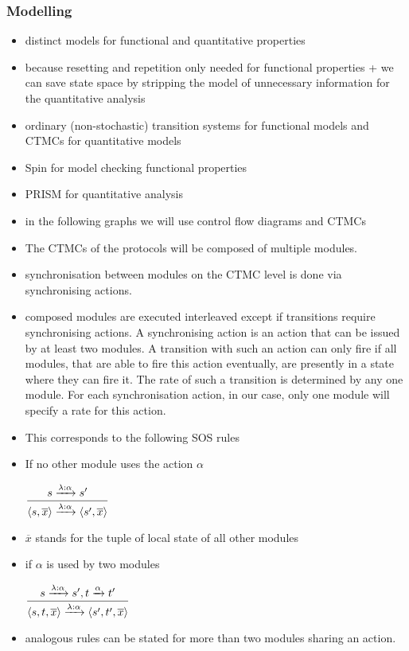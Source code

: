 \documentclass[a4paper, 10pt]{article}
\begin{document}
\subsubsection{Modelling} %
\label{sssec:analysis-modelchecking-modelling}
\begin{itemize}
	\item distinct models for functional and quantitative properties
	\item because resetting and repetition only needed for functional properties + we can save state space by stripping the model of unnecessary information for the quantitative analysis
	\item ordinary (non-stochastic) transition systems for functional models and CTMCs for quantitative models
	\item Spin\cite{spin, hol97} for model checking functional properties
	\item PRISM\cite{prism, knp09} for quantitative analysis
	\item in the following graphs we will use control flow diagrams and CTMCs
	\item The CTMCs of the protocols will be composed of multiple modules.
	\item synchronisation between modules on the CTMC level is done via synchronising actions.
	\item composed modules are executed interleaved except if transitions require synchronising actions. A synchronising action is an action that can be issued by at least two modules. A transition with such an action can only fire if all modules, that are able to fire this action eventually, are presently in a state where they can fire it. The rate of such a transition is determined by any one module. For each synchronisation action, in our case, only one module will specify a rate for this action.
	\item This corresponds to the following SOS rules
	\item If no other module uses the action $\alpha$
		\begin{center}
			$\mathlarger{\frac{s \xrightarrow{\lambda : \alpha} s'}{\langle s , \overline{x} \rangle \xrightarrow{\lambda : \alpha} \langle s', \overline{x} \rangle}}$
		\end{center}
	\item $\overline{x}$ stands for the tuple of local state of all other modules
	\item if $\alpha$ is used by two modules
		\begin{center}
			$\mathlarger{\frac{s \xrightarrow{\lambda : \alpha} s', t \xrightarrow{\alpha} t'}{\langle s, t , \overline{x} \rangle \xrightarrow{\lambda : \alpha} \langle s', t', \overline{x} \rangle}}$
		\end{center}
	\item analogous rules can be stated for more than two modules sharing an action.
\end{itemize}
\end{document}
